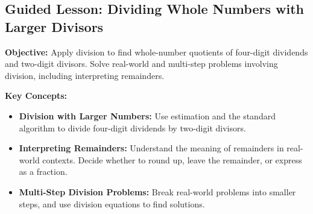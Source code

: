 \documentclass[12pt]{article}
\title{}
\date{}
\begin{document}
\subsection*{Guided Lesson: Dividing Whole Numbers with Larger Divisors}
\onehalfspacing

\begin{tcolorbox}[colframe=black!40, colback=gray!5, 
coltitle=black, colbacktitle=black!20, fonttitle=\bfseries\Large, 
title=Learning Objective, halign title=center, left=5pt, right=5pt, top=5pt, bottom=15pt]
\textbf{Objective:} Apply division to find whole-number quotients of four-digit dividends and two-digit divisors. Solve real-world and multi-step problems involving division, including interpreting remainders.
\end{tcolorbox}

\vspace{1em}

\begin{tcolorbox}[colframe=black!60, colback=white, 
coltitle=black, colbacktitle=black!15, fonttitle=\bfseries\Large, 
title=Key Concepts and Vocabulary, halign title=center, left=10pt, right=10pt, top=10pt, bottom=15pt]
\textbf{Key Concepts:}
\begin{itemize}
    \item \textbf{Division with Larger Numbers:} Use estimation and the standard algorithm to divide four-digit dividends by two-digit divisors.
    \item \textbf{Interpreting Remainders:} Understand the meaning of remainders in real-world contexts. Decide whether to round up, leave the remainder, or express as a fraction.
    \item \textbf{Multi-Step Division Problems:} Break real-world problems into smaller steps, and use division equations to find solutions.
\end{itemize}
\end{tcolorbox}

\vspace{1em}
\end{document}
